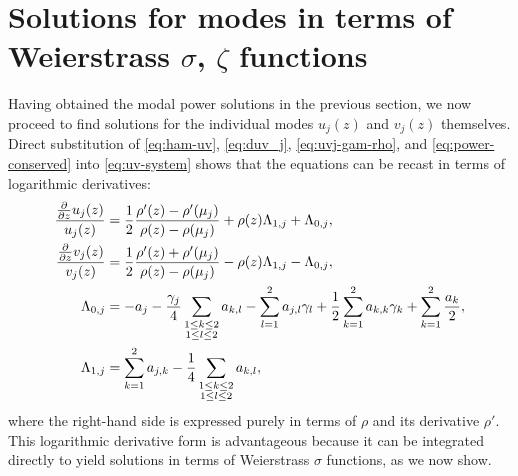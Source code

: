 \documentclass[11pt,a4paper]{article}
\numberwithin{equation}{section}
\begin{document}

\section{Solutions for modes in terms of Weierstrass \texorpdfstring{$\sigma$}{sigma}, \texorpdfstring{$\zeta$}{zeta} functions} \label{sec:mode-sols-u-v}

Having obtained the modal power solutions in the previous section, we now proceed to find solutions for the individual modes $u_j(z)$ and $v_j(z)$ themselves.
Direct substitution of \eqref{eq:ham-uv}, \eqref{eq:duv_j}, \eqref{eq:uvj-gam-rho}, and \eqref{eq:power-conserved} into \eqref{eq:uv-system} shows that the equations can be recast in terms of logarithmic derivatives:
\begin{align}
\frac{\frac{\partial}{\partial z} u_j{\left(z\right)}}{u_j{\left(z\right)}} &= \frac{1}{2}\frac{\rho'{\left(z \right)} - \rho'{\left({\mu}_{j} \right)}}{\rho{\left(z \right)} - \rho{\left({\mu}_{j} \right)}} + \rho{\left(z \right)} {\Lambda}_{1,j} + {\Lambda}_{0,j}, \notag \\
\frac{\frac{\partial}{\partial z} v_j{\left(z\right)}}{v_j{\left(z\right)}} &= \frac{1}{2}\frac{\rho'{\left(z \right)} + \rho'{\left({\mu}_{j} \right)}}{\rho{\left(z \right)} - \rho{\left({\mu}_{j} \right)}} - \rho{\left(z \right)} {\Lambda}_{1,j} - {\Lambda}_{0,j}, \label{eq:dlog-u-v-rho} \\
{\Lambda}_{0,j} &= - {a}_{j} - \frac{{\gamma}_{j}}{4}\sum_{\substack{1 \leq k \leq 2\\1 \leq l \leq 2}} {a}_{k,l} - \sum_{l=1}^{2} {a}_{j,l} {\gamma}_{l} + \frac{1}{2}\sum_{k=1}^{2} {a}_{k,k} {\gamma}_{k} + \sum_{k=1}^{2} \frac{{a}_{k}}{2}, \\
{\Lambda}_{1,j} &= \sum_{k=1}^{2} {a}_{j,k} - \frac{1}{4}\sum_{\substack{1 \leq k \leq 2\\1 \leq l \leq 2}}{a}_{k,l},
\end{align}
where the right-hand side is expressed purely in terms of $\rho$ and its derivative $\rho'$.
This logarithmic derivative form is advantageous because it can be integrated directly to yield solutions in terms of Weierstrass $\sigma$ functions, as we now show.
\end{document}
